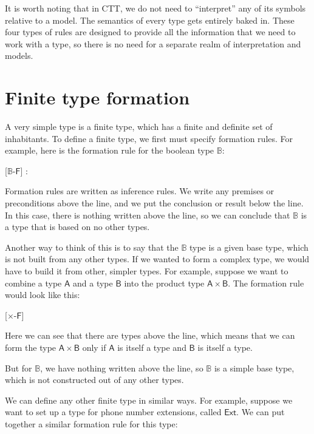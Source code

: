 \documentclass{article}
\newcommand\hypo{\Hypo}
\newcommand\infer{\Infer}
\newcommand\term{\mathsf}
\def\Type/{\term{Type}}
\def\Form/{\term{F}}
\def\Bool/{\mathbb{B}}
\def\BoolF/{$\Bool/$-$\Form/$}
\begin{document}
It is worth noting that in CTT, we do not need to ``interpret'' any of its symbols relative to a model. The semantics of every type gets entirely baked in. These four types of rules are designed to provide all the information that we need to work with a type, so there is no need for a separate realm of interpretation and models.


\section{Finite type formation}

A very simple type is a finite type, which has a finite and definite set of inhabitants. To define a finite type, we first must specify formation rules. For example, here is the formation rule for the boolean type $\Bool/$:

\begin{prooftree*}
  \hypo{}
  \infer1[\BoolF/]{\Bool/ : \Type/}
\end{prooftree*}

Formation rules are written as inference rules. We write any premises or preconditions above the line, and we put the conclusion or result below the line. In this case, there is nothing written above the line, so we can conclude that $\Bool/$ is a type that is based on no other types.

Another way to think of this is to say that the $\Bool/$ type is a given base type, which is not built from any other types. If we wanted to form a complex type, we would have to build it from other, simpler types. For example, suppose we want to combine a type $\term{A}$ and a type $\term{B}$ into the product type $\term{A} \times \term{B}$. The formation rule would look like this:

\begin{prooftree*}
  \hypo{\term{A} : \Type/}
  \hypo{\term{B} : \Type/}
  \infer2[$\times$-$\Form/$]{\term{A} \times \term{B}}
\end{prooftree*}  

Here we can see that there are types above the line, which means that we can form the type $\term{A} \times \term{B}$ only if $\term{A}$ is itself a type and $\term{B}$ is itself a type.

But for $\Bool/$, we have nothing written above the line, so $\Bool/$ is a simple base type, which is not constructed out of any other types. 

We can define any other finite type in similar ways. For example, suppose we want to set up a type for phone number extensions, called $\term{Ext}$. We can put together a similar formation rule for this type:
\end{document}

